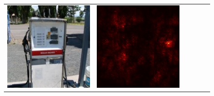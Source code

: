 \documentclass[preprint,12pt]{elsarticle}
\begin{document}
\begin{figure}[p]
\begin{tabular}{cccccc}
  \includegraphics[scale=\scale]{../visualizations/examples/imagenette/cnn/images/9.png} &
  \includegraphics[scale=\scale]{../visualizations/examples/imagenette/cnn/saliency_map/9.png} & 

\end{tabular}
\end{figure}
\end{document}
